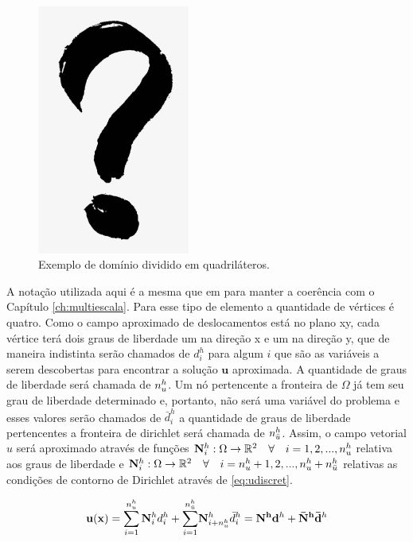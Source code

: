\begin{figure}[!htbp]
\centering
\includegraphics[width=5cm]{interrogacao.png}
\caption{Exemplo de domínio dividido em quadriláteros.}
\label{fig:elemento}
\end{figure}

A notação utilizada aqui é a mesma que em \cite{casteletto} para manter a coerência com o Capítulo \ref{ch:multiescala}. Para esse tipo de elemento a quantidade de vértices é quatro. Como o campo aproximado de deslocamentos está no plano xy, cada vértice terá dois graus de liberdade um na direção x e um na direção y, que de maneira indistinta serão chamados de $d_i^h$ para algum $i$ que são as variáveis a serem descobertas para encontrar a solução $\textbf{u}$ aproximada. A quantidade de graus de liberdade será chamada de $n_u^h$. Um nó pertencente a fronteira de $\Omega$  já tem seu grau de liberdade determinado e, portanto, não será uma variável do problema e esses valores serão chamados de $\bar{d}_i^h$ a quantidade de graus de liberdade pertencentes a fronteira de dirichlet será chamada de $n_{\bar{u}}^h$.  Assim, o campo vetorial $u$ será aproximado através de funções $ {\mathbf{N}_{i}^h} : \Omega \rightarrow \mathbb{R}^2 \quad \forall \quad i=1,2,...,n_u^h$  relativa aos graus de liberdade e  $ {\mathbf{N}_{i}^h} : \Omega \rightarrow \mathbb{R}^2 \quad \forall \quad i=n_u^h+1,2,...,n_u^h + n_{\bar{u}}^h$  relativas as condições de contorno de Dirichlet através de \eqref{eq:udiscret}.


\begin{equation}\label{eq:udiscret}
\mathbf{u}(\mathbf{x}) = \sum_{i=1}^{n_u^h} {\mathbf{N}_{i}^h}  d_i^h + {\sum_{i=1}^ {n^h_{\bar{u}}}}  \mathbf{N}_{i+n_u^h}^h \bar{d}_i^h = \mathbf{N^h} \mathbf{d}^h + \mathbf{\bar{N}^h} \mathbf{\bar{d}}^h
\end{equation}

